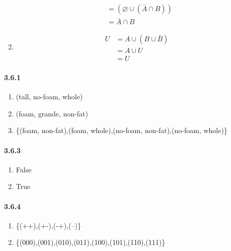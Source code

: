 \documentclass[11pt, letterpaper, twocolumn, fleqn]{article}
\let\emptyset\varnothing
\begin{document}
\begin{enumerate}
\begin{align*}
                               &=(\emptyset \cup (\bar{A} \cap B))      \tag{Complement}\\
                               &=\bar{A} \cap B                         \tag{Identity}
            \end{align*}
        \addtocounter{enumi}{2}
        \item
            \begin{align*}
                U &= A \cup (B \cup \bar{B})    \\
                  &= A \cup U   \tag{Complement}\\
                  &= U          \tag{Domination}
            \end{align*}
    \end{enumerate}
    
    \paragraph{3.6.1}
    \renewcommand{\labelenumi}{\alph{enumi}.}
    \begin{enumerate}
        \item (tall, no-foam, whole)
        \item (foam, grande, non-fat)
        \item \{(foam, non-fat),(foam, whole),(no-foam, non-fat),(no-foam, whole)\}
    \end{enumerate}
    
    \paragraph{3.6.3}
    \renewcommand{\labelenumi}{\alph{enumi}.}
    \begin{enumerate}
        \item False
        \item True
    \end{enumerate}
    
    \paragraph{3.6.4}
    \renewcommand{\labelenumi}{\alph{enumi}.}
    \begin{enumerate}
        \item \{(++),(+-),(-+),(--)\} 
        \item \{(000),(001),(010),(011),(100),(101),(110),(111)\}
    \end{enumerate}
    
\end{document}
